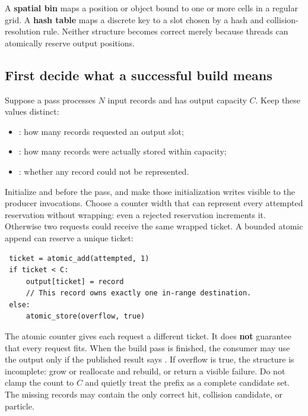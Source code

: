A \textbf{spatial bin} maps a position or object bound to one or more cells in a regular grid. A \textbf{hash table} maps a discrete key to a slot chosen by a hash and collision-resolution rule. Neither structure becomes correct merely because threads can atomically reserve output positions.

\subsection{First decide what a successful build means}\label{03-visual-computing-i-ch016-first-decide-what-a-successful-build-means}

\hypertarget{03-visual-computing-i-ch016-first-decide-what-a-successful-build-means}{}

Suppose a pass processes \(N\) input records and has output capacity \(C\). Keep these values distinct:

\begin{itemize}
\tightlist
\item
  : how many records requested an output slot;
\item
  : how many records were actually stored within capacity;
\item
  : whether any record could not be represented.
\end{itemize}

Initialize  and  before the pass, and make those initialization writes visible to the producer invocations. Choose a counter width that can represent every attempted reservation without wrapping: even a rejected reservation increments it. Otherwise two requests could receive the same wrapped ticket. A bounded atomic append can reserve a unique ticket:

\begin{verbatim}
 ticket = atomic_add(attempted, 1)
 if ticket < C:
     output[ticket] = record
     // This record owns exactly one in-range destination.
 else:
     atomic_store(overflow, true)
\end{verbatim}

The atomic counter gives each request a different ticket. It does \textbf{not} guarantee that every request fits. When the build pass is finished, the consumer may use the output only if the published result says . If overflow is true, the structure is incomplete: grow or reallocate and rebuild, or return a visible failure. Do not clamp the count to \(C\) and quietly treat the prefix as a complete candidate set. The missing records may contain the only correct hit, collision candidate, or particle.

